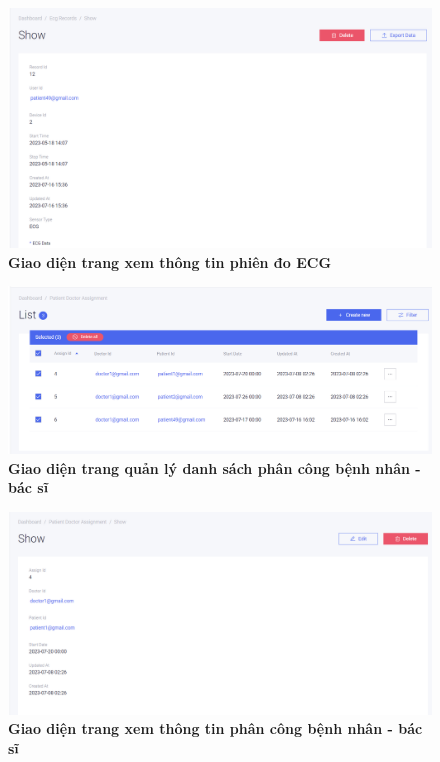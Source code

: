 \begin{figure}[H]
  \centering
  \includegraphics[scale=0.5]{Images/server/webUI/ecg_record_show.PNG}
  \caption[Giao diện trang xem thông tin phiên đo ECG]{\bfseries \fontsize{12pt}{0pt}\selectfont Giao diện trang xem thông tin phiên đo ECG}
  \label{ecg_record_show} %
\end{figure}


\begin{figure}[H]
  \centering
  \includegraphics[scale=0.5]{Images/server/webUI/pat_doc_list.PNG}
  \caption[Giao diện trang quản lý danh sách phân công bệnh nhân - bác sĩ]{\bfseries \fontsize{12pt}{0pt}\selectfont Giao diện trang quản lý danh sách phân công bệnh nhân - bác sĩ}
  \label{pat_doc_list} %
\end{figure}

\begin{figure}[H]
  \centering
  \includegraphics[scale=0.5]{Images/server/webUI/pat_doc_show.PNG}
  \caption[Giao diện trang xem thông tin phân công bệnh nhân - bác sĩ]{\bfseries \fontsize{12pt}{0pt}\selectfont Giao diện trang xem thông tin phân công bệnh nhân - bác sĩ}
  \label{pat_doc_show} %
\end{figure}

